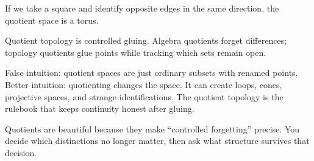 \begin{center}
\end{center}

\begin{example}
If we take a square and identify opposite edges in the same direction, the
quotient space is a torus.
\end{example}

\begin{center}
\end{center}

\begin{intuitionbox}
Quotient topology is controlled gluing. Algebra quotients forget differences;
topology quotients glue points while tracking which sets remain open.
\end{intuitionbox}

\begin{trapbox}
False intuition: quotient spaces are just ordinary subsets with renamed points.
Better intuition: quotienting changes the space. It can create loops, cones,
projective spaces, and strange identifications. The quotient topology is the
rulebook that keeps continuity honest after gluing.
\end{trapbox}

\begin{aestheticbox}
Quotients are beautiful because they make ``controlled forgetting'' precise.
You decide which distinctions no longer matter, then ask what structure survives
that decision.
\end{aestheticbox}


